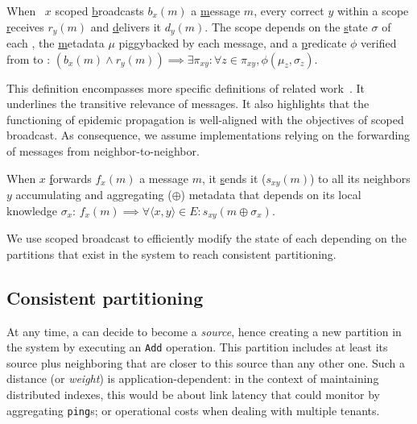 \begin{definition}
  When \Process~$x$ scoped \underline{b}roadcasts $b_x(m)$ a
  \underline{m}essage $m$, every correct \process $y$ within a scope
  \underline{r}eceives $r_y(m)$ and \underline{d}elivers it
  $d_y(m)$. The scope depends on the \underline{s}tate $\sigma$ of
  each \process, the \underline{m}etadata $\mu$ piggybacked by each
  message, and a \underline{p}redicate $\phi$ verified from \process
  to \process:
  $(b_x(m) \wedge r_y(m)) \implies \exists \pi_{xy}: \forall z \in
  \pi_{xy}, \phi(\mu_z, \sigma_z)$.
\end{definition}

This definition encompasses more specific definitions of related
work~\cite{hsiao2005scoped,lue2006scoped,wang2015prodiluvian}. It
underlines the transitive relevance of messages. It also highlights
that the functioning of epidemic propagation is well-aligned with the
objectives of scoped broadcast. As consequence, we assume
implementations relying on the forwarding of messages from
neighbor-to-neighbor.

\begin{definition}
  When $x$ \underline{f}orwards $f_x(m)$ a message $m$, it
  \underline{s}ends it ($s_{xy}(m)$) to all its neighbors $y$
  accumulating and aggregating ($\oplus$) metadata that depends on its
  local knowledge $\sigma_x$: $f_x(m) \implies \forall \langle x,
  y\rangle \in E: s_{xy}(m \oplus \sigma_x)$.
\end{definition}

We use scoped broadcast to efficiently modify the state of each
\process depending on the partitions that exist in the system to reach consistent partitioning.



\subsection{Consistent partitioning}
\label{subsec:consistent}

At any time, a \process can decide to become a \emph{source}, hence
creating a new partition in the system by executing an \texttt{Add}
operation. This partition includes at least its source plus
neighboring \processes that are closer to this source than any other
one. Such a distance (or \emph{weight}) is application-dependent: in
the context of maintaining distributed indexes, this would be about
link latency that \nodes could monitor by aggregating \texttt{ping}s;
or operational costs when dealing with multiple tenants.


